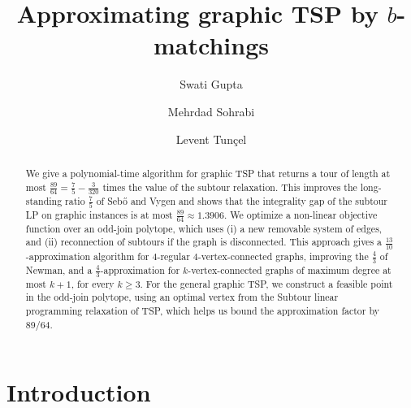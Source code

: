 \documentclass[11pt]{amsart}
\newcommand{\1}{\mathbbm{1}}
\begin{document}
\title[Approximating graphic TSP by $b$-matchings]{Approximating graphic TSP by $b$-matchings}
\date{}
\author{Swati Gupta}
\address{MIT Sloan School of Management.}
\author{Mehrdad Sohrabi}
\address{Department of Combinatorics and Optimization, Faculty of Mathematics, University of Waterloo, Ontario, Canada. Research of this author was supported in part by a Discovery Grant from NSERC.}

\author{Levent Tun\c{c}el}
\address{Department of Combinatorics and Optimization, Faculty of Mathematics, University of Waterloo, Ontario, Canada. Research of this author was supported in part by a Discovery Grant from NSERC.}

\begin{abstract}
We give a polynomial-time algorithm for graphic TSP that returns a tour of length at most
$\frac{89}{64}=\frac{7}{5}-\frac{3}{320}$ times the value of the subtour relaxation.
This improves the long-standing ratio $\frac75$ of Seb\H{o} and Vygen and shows that the
integrality gap of the subtour LP on graphic instances is at most
$\frac{89}{64}\approx 1.3906$. {We optimize a non-linear objective function over an odd-join polytope, which uses (i) a new removable system of edges, and (ii) reconnection of subtours if the graph is disconnected. This approach gives a $\frac{13}{10}$-approximation algorithm for $4$-regular
$4$-vertex-connected graphs, improving the $\frac43$ of Newman, and a
$\frac43$-approximation for $k$-vertex-connected graphs of maximum degree at most $k+1$,
for every $k\ge 3$. For the general graphic TSP, we construct a feasible point in the odd-join polytope, using an optimal vertex from the Subtour linear programming relaxation of TSP, which helps us bound the approximation factor by 89/64.}


\end{abstract}

\maketitle

\section{Introduction}
\label{sec:approach-generalization}
\end{document}

